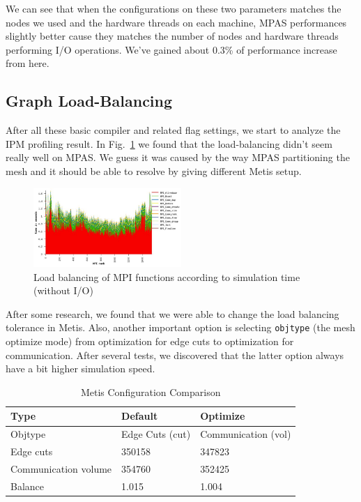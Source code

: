We can see that when the configurations on these two parameters matches the nodes we used and the hardware threads on each machine, MPAS performances slightly better cause they matches the number of nodes and hardware threads performing I/O operations. We've gained about 0.3\% of performance increase from here.

\subsection{Graph Load-Balancing}
After all these basic compiler and related flag settings, we start to analyze the IPM profiling result. In Fig.~\ref{figure:profile-before} we found that the load-balancing didn't seem really well on MPAS. We guess it was caused by the way MPAS partitioning the mesh and it should be able to resolve by giving different Metis setup. 

\begin{figure}[h]
    \centering
    \includegraphics[width=0.5\textwidth]{profileBefore.JPG} 
    \caption{Load balancing of MPI functions according to simulation time (without I/O)}
    \label{figure:profile-before}
\end{figure}

After some research, we found that we were able to change the load balancing tolerance in Metis. Also, another important option is selecting \texttt{objtype} (the mesh optimize mode) from optimization for edge cuts to optimization for communication. After several tests, we discovered that the latter option always have a bit higher simulation speed.

\begin{table}[ht]
    \centering
    \caption{Metis Configuration Comparison}
    \begin{tabular}{lll}
        \toprule
        Type & Default & Optimize  \\
        \midrule
        Objtype & Edge Cuts (cut) & Communication (vol) \\
        Edge cuts & 350158 & 347823 \\
        Communication volume & 354760 & 352425 \\
        Balance & 1.015 & 1.004 \\
        \bottomrule
    \end{tabular}
    \label{table:metis-configuration}
\end{table}

